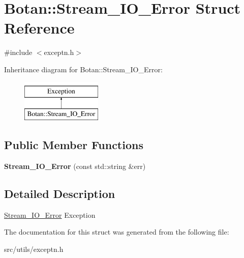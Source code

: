 \hypertarget{structBotan_1_1Stream__IO__Error}{\section{Botan\-:\-:Stream\-\_\-\-I\-O\-\_\-\-Error Struct Reference}
\label{structBotan_1_1Stream__IO__Error}
}


{\ttfamily \#include $<$exceptn.\-h$>$}

Inheritance diagram for Botan\-:\-:Stream\-\_\-\-I\-O\-\_\-\-Error\-:\begin{figure}[H]
\begin{center}
\leavevmode
\includegraphics[height=2.000000cm]{structBotan_1_1Stream__IO__Error}
\end{center}
\end{figure}
\subsection*{Public Member Functions}
\begin{DoxyCompactItemize}
\item 
\hypertarget{structBotan_1_1Stream__IO__Error_a90d5fa7a67747d8d1f9a1311800233d6}{{\bfseries Stream\-\_\-\-I\-O\-\_\-\-Error} (const std\-::string \&err)}\label{structBotan_1_1Stream__IO__Error_a90d5fa7a67747d8d1f9a1311800233d6}

\end{DoxyCompactItemize}


\subsection{Detailed Description}
\hyperlink{structBotan_1_1Stream__IO__Error}{Stream\-\_\-\-I\-O\-\_\-\-Error} Exception 

The documentation for this struct was generated from the following file\-:\begin{DoxyCompactItemize}
\item 
src/utils/exceptn.\-h\end{DoxyCompactItemize}

